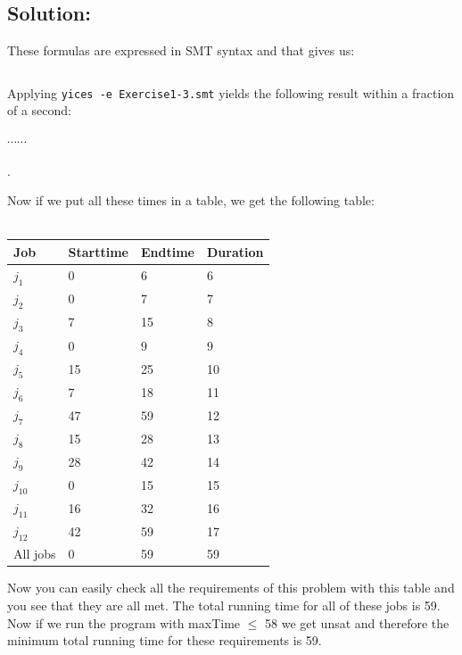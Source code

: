 \documentclass[12pt]{article}
\begin{document}
{\subsection*{Solution:}


\noindent These formulas are expressed in SMT syntax and that gives us:

{\footnotesize
\begin{verbatim}

\end{verbatim}
}

\noindent Applying {\tt yices -e Exercise1-3.smt} yields the following result
within a fraction of a second:

{\footnotesize



$\cdots \cdots$ }.

\noindent Now if we put all these times in a table, we get the following table:\\
\\
\begin{tabular}{| l | l | l | l |}
\hline
Job	& Starttime	& Endtime	& Duration\\
\hline
$j_1$	& 0	&	6	&	6\\
$j_2$	& 0	&	7	&	7\\
$j_3$	& 7	&	15	&	8\\
$j_4$	& 0	&	9	&	9\\
$j_5$	& 15	&	25	&	10\\
$j_6$	& 7	&	18	&	11\\
$j_7$	& 47	&	59	&	12\\
$j_8$	& 15	&	28	&	13\\
$j_9$	& 28	&	42	&	14\\
$j_{10}$	& 0	&	15	&	15\\
$j_{11}$	& 16	&	32	&	16\\
$j_{12}$	& 42	&	59	&	17\\
\hline
All jobs	&	0	&	59	&	59\\
\hline
\end{tabular}

\vspace{3mm}

Now you can easily check all the requirements of this problem with this table and you see that they are all met. The total running time for all of these jobs is 59. Now if we run the program with maxTime $\leq$ 58 we get unsat and therefore the minimum total running time for these requirements is 59.

\vspace{3mm}

}
\end{document}
